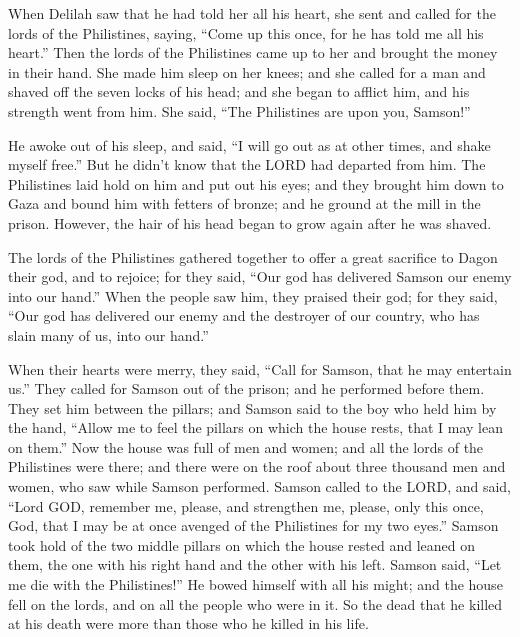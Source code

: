  When Delilah saw that he had told her all his heart, she
sent and called for the lords of the Philistines, saying, ``Come up this
once, for he has told me all his heart.'' Then the lords of the
Philistines came up to her and brought the money in their hand.
 She made him sleep on her knees; and she called for a man
and shaved off the seven locks of his head; and she began to afflict
him, and his strength went from him.  She said, ``The
Philistines are upon you, Samson!''

He awoke out of his sleep, and said, ``I will go out as at other times,
and shake myself free.'' But he didn't know that the LORD had departed
from him.  The Philistines laid hold on him and put out his
eyes; and they brought him down to Gaza and bound him with fetters of
bronze; and he ground at the mill in the prison.  However,
the hair of his head began to grow again after he was shaved.

 The lords of the Philistines gathered together to offer a
great sacrifice to Dagon their god, and to rejoice; for they said, ``Our
god has delivered Samson our enemy into our hand.''  When
the people saw him, they praised their god; for they said, ``Our god has
delivered our enemy and the destroyer of our country, who has slain many
of us, into our hand.''

 When their hearts were merry, they said, ``Call for
Samson, that he may entertain us.'' They called for Samson out of the
prison; and he performed before them. They set him between the pillars;
 and Samson said to the boy who held him by the hand,
``Allow me to feel the pillars on which the house rests, that I may lean
on them.''  Now the house was full of men and women; and
all the lords of the Philistines were there; and there were on the roof
about three thousand men and women, who saw while Samson performed.
 Samson called to the LORD, and said, ``Lord GOD, remember
me, please, and strengthen me, please, only this once, God, that I may
be at once avenged of the Philistines for my two eyes.'' 
Samson took hold of the two middle pillars on which the house rested and
leaned on them, the one with his right hand and the other with his left.
 Samson said, ``Let me die with the Philistines!'' He bowed
himself with all his might; and the house fell on the lords, and on all
the people who were in it. So the dead that he killed at his death were
more than those who he killed in his life.

